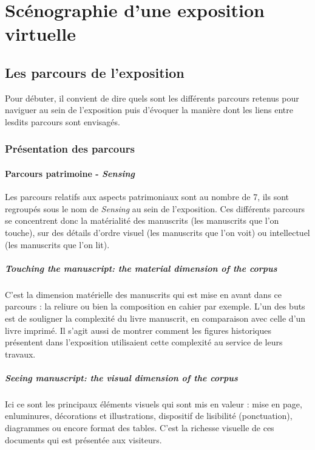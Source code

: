 \part{Scénographie d'une exposition virtuelle}
	
	\chapter{Les parcours de l’exposition}
	Pour débuter, il convient de dire quels sont les différents parcours retenus pour naviguer au sein de l'exposition puis d'évoquer la manière dont les liens entre lesdits parcours sont envisagés.
	
	\section{Présentation des parcours}
	\subsection{Parcours patrimoine - \textit{Sensing}}
	Les parcours relatifs aux aspects patrimoniaux sont au nombre de 7, ils sont regroupés sous le nom de \textit{Sensing} au sein de l'exposition. Ces différents parcours se concentrent donc la matérialité des manuscrits (les manuscrits que l'on touche), sur des détails d'ordre visuel (les manuscrits que l'on voit) ou intellectuel (les manuscrits que l'on lit). 
	
	\subsubsection{\textit{Touching the manuscript: the material dimension of the corpus}}
	C'est la dimension matérielle des manuscrits qui est mise en avant dans ce parcours : la reliure ou bien la composition en cahier par exemple. L'un des buts est de souligner la complexité du livre manuscrit, en comparaison avec celle d'un livre imprimé. Il s'agit aussi de montrer comment les figures historiques présentent dans l'exposition utilisaient cette complexité au service de leurs travaux. 
	
	\subsubsection{\textit{Seeing manuscript: the visual dimension of the corpus}}
	Ici ce sont les principaux éléments visuels qui sont mis en valeur : mise en page, enluminures, décorations et illustrations, dispositif de lisibilité (ponctuation), diagrammes ou encore format des tables. C’est la richesse visuelle de ces documents qui est présentée aux visiteurs.

